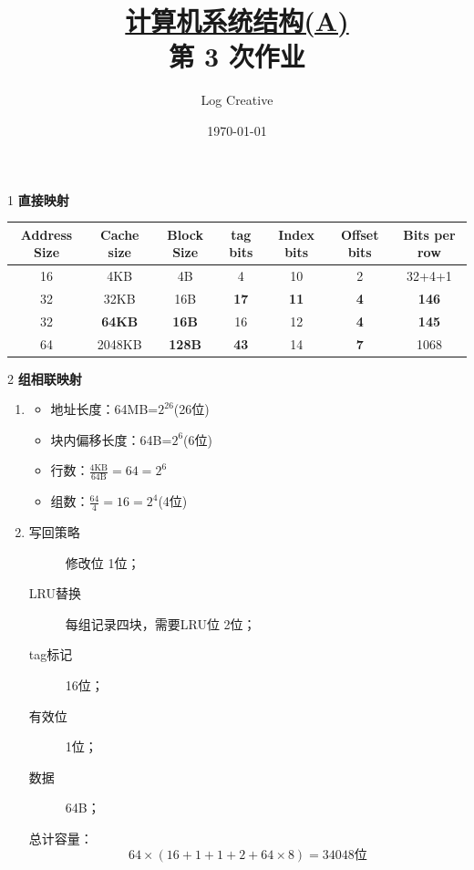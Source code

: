 \documentclass[12pt,a4paper]{article}
\newenvironment{problems}{\begin{list}{}{\renewcommand{\makelabel}[1]{\textbf{##1}.\hfil}}}{\end{list}}
\begin{document}
\title{\normalsize \underline{计算机系统结构(A)}\\\LARGE 第 3 次作业}
\author{Log Creative }
\date{\today}
\maketitle

\begin{problems}
    \item[1] \textbf{直接映射}
     
\begin{tabular}{ccccccc}
Address Size & Cache size & Block Size &tag bits & Index bits & Offset bits & Bits per row \\
\hline
16& 4KB	    &4B	    &4	&10	&2	    &32+4+1\\
32& 32KB	&16B	& \bfseries 17& \bfseries	11& \bfseries	4&\bfseries	146\\
32& \bfseries 64KB	&\bfseries 16B	&16&	12&	\bfseries 4&\bfseries	145\\
64& 2048KB	&\bfseries 128B	&\bfseries 43&	14&	\bfseries 7&	1068\\
\hline
\end{tabular}

\item[2] \textbf{组相联映射}
\begin{enumerate}[(1)]
    \item 
    \begin{itemize}
        \item 地址长度：64MB=$2^{26}$(26位)
        \item 块内偏移长度：64B=$2^6$(6位)
        \item 行数：$\frac{\text{4KB}}{\text{64B}}=64=2^6$
        \item 组数：$\frac{64}{4}=16=2^4$(4位)
    \end{itemize}
   

    \item \begin{description}
        \item[写回策略] 修改位 1位；
        \item[LRU替换] 每组记录四块，需要LRU位 2位；
        \item[tag标记] 16位；
        \item[有效位]  1位；
        \item[数据]    64B； 
    \end{description}
    总计容量：
    \begin{equation*}
        64\times (16+1+1+2+64\times 8) = 34048\text{位}
    \end{equation*}
\end{enumerate}


\end{problems}
\end{document}
